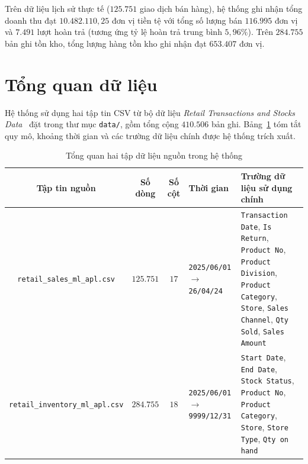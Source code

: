 Trên dữ liệu lịch sử thực tế ($125.751$ giao dịch bán hàng), hệ thống ghi nhận tổng doanh thu đạt $10.482.110{,}25$ đơn vị tiền tệ với tổng số lượng bán $116.995$ đơn vị và $7.491$ lượt hoàn trả (tương ứng tỷ lệ hoàn trả trung bình $5{,}96\%$). Trên $284.755$ bản ghi tồn kho, tổng lượng hàng tồn kho ghi nhận đạt $653.407$ đơn vị.

\section{Tổng quan dữ liệu}
\label{sec:data-overview}
Hệ thống sử dụng hai tập tin CSV từ bộ dữ liệu \textit{Retail Transactions and Stocks Data}~\cite{smith2026retail} đặt trong thư mục \texttt{data/}, gồm tổng cộng $410.506$ bản ghi. Bảng~\ref{tab:data-overview} tóm tắt quy mô, khoảng thời gian và các trường dữ liệu chính được hệ thống trích xuất.

\begin{table}[H]
	\centering
	\footnotesize
	\begin{tabular}{c c c p{1.6cm} p{5.8cm}}
		\toprule
		\textbf{Tập tin nguồn}                         & \textbf{Số dòng} & \textbf{Số cột} & \centering\textbf{Thời gian}                                     & \textbf{Trường dữ liệu sử dụng chính}                                                                                                                                                                                                                                                                \\
		\midrule
		\texttt{retail_sales_ml_apl.csv}     & $125.751$        & $17$            & \texttt{2025/06/01} $\rightarrow$ \texttt{26/04/24}              & \texttt{Transaction Date}, \texttt{Is Return}, \texttt{Product No}, \texttt{Product Division}, \texttt{Product Category}, \texttt{Store}, \texttt{Sales Channel}, \texttt{Qty Sold}, \texttt{Sales Amount} \\
		\midrule
		\texttt{retail_inventory_ml_apl.csv} & $284.755$        & $18$            & \texttt{2025/06/01} $\rightarrow$  \texttt{9999/12/31} & \texttt{Start Date}, \texttt{End Date}, \texttt{Stock Status}, \texttt{Product No}, \texttt{Product Category}, \texttt{Store}, \texttt{Store Type}, \texttt{Qty on hand}                                             \\
		\bottomrule
	\end{tabular}
	\caption{Tổng quan hai tập dữ liệu nguồn trong hệ thống}
	\label{tab:data-overview}
\end{table}

